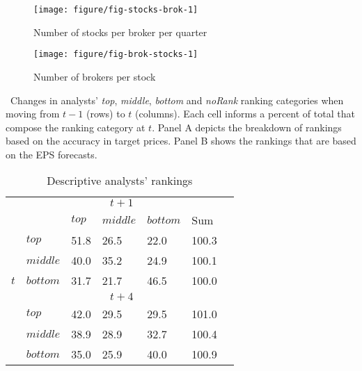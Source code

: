 \begin{knitrout}
\color{fgcolor}\begin{figure}
\texttt{[image: figure/fig-stocks-brok-1]} \caption[Number of stocks per broker per quarter]{Number of stocks per broker per quarter\label{num-s-bfig-stocks-brok}}
\end{figure}


\end{knitrout}

\begin{knitrout}
\color{fgcolor}\begin{figure}
\texttt{[image: figure/fig-brok-stocks-1]} \caption[Number of brokers per stock]{Number of brokers per stock\label{num-b-sfig-brok-stocks}}
\end{figure}


\end{knitrout}


\begin{table}[hp]
\caption{Descriptive analysts' rankings}
\label{tab:top}
\ Changes in analysts' \emph{top}, \emph{middle}, \emph{bottom} and \emph{noRank} ranking categories when moving from $t-1$ (rows) to $t$ (columns). Each cell informs a percent of total that compose the ranking category at $t$. Panel A depicts the breakdown of rankings  based on the accuracy in target prices. Panel B shows the rankings that are based on the EPS forecasts.
\begin{center}
\begin{tabularx}{\linewidth}{r*{6}{Y}}
  & \\
&&$top$&$middle$&$bottom$&Sum\\
 &$top$ & 51.8 & 26.5 & 22.0 & 100.3 \\ 
  &$middle$ & 40.0 & 35.2 & 24.9 & 100.1 \\ 
  &$bottom$ & 31.7 & 21.7 & 46.5 & 100.0 \\ 
    &\\ 
&$top$ & 42.0 & 29.5 & 29.5 & 101.0 \\ 
  &$middle$ & 38.9 & 28.9 & 32.7 & 100.4 \\ 
  &$bottom$ & 35.0 & 25.9 & 40.0 & 100.9 \\ 
  
\bottomrule
\end{tabularx}
\end{center}
\end{table}

